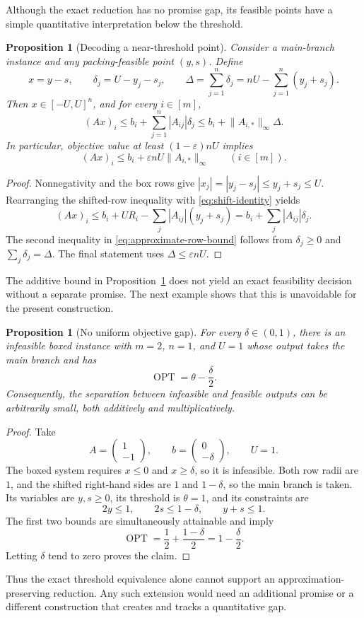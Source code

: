 \documentclass[11pt]{article}
\newtheorem{proposition}[theorem]{Proposition}
\theoremstyle{remark}
\newcommand{\OPT}{\operatorname{OPT}}
\begin{document}
Although the exact reduction has no promise gap, its feasible points
have a simple quantitative interpretation below the threshold.

\begin{proposition}[Decoding a near-threshold point]
\label{prop:approximate-decoding}
Consider a main-branch instance and any packing-feasible point
$(y,s)$.  Define
\[
  x=y-s,
  \qquad
  \delta_j=U-y_j-s_j,
  \qquad
  \Delta=\sum_{j=1}^n\delta_j
  =nU-\sum_{j=1}^n(y_j+s_j).
\]
Then $x\in[-U,U]^n$, and for every $i\in[m]$,
\begin{equation}
  \label{eq:approximate-row-bound}
  (Ax)_i
  \leq b_i+\sum_{j=1}^n|A_{ij}|\delta_j
  \leq b_i+\lVert A_{i,*}\rVert_\infty\Delta.
\end{equation}
In particular, objective value at least $(1-\varepsilon)nU$ implies
\[
  (Ax)_i\leq b_i+
  \varepsilon nU\lVert A_{i,*}\rVert_\infty
  \qquad(i\in[m]).
\]
\end{proposition}

\begin{proof}
Nonnegativity and the box rows give
$|x_j|=|y_j-s_j|\leq y_j+s_j\leq U$.  Rearranging the shifted-row
inequality with \eqref{eq:shift-identity} yields
\[
  (Ax)_i
  \leq b_i+UR_i-\sum_j|A_{ij}|(y_j+s_j)
  =b_i+\sum_j|A_{ij}|\delta_j.
\]
The second inequality in \eqref{eq:approximate-row-bound} follows
from $\delta_j\geq0$ and $\sum_j\delta_j=\Delta$.  The final statement
uses $\Delta\leq\varepsilon nU$.
\end{proof}

The additive bound in Proposition~\ref{prop:approximate-decoding} does not yield
an exact feasibility decision without a separate promise.  The next
example shows that this is unavoidable for the present construction.

\begin{proposition}[No uniform objective gap]
\label{prop:no-gap}
For every $\delta\in(0,1)$, there is an infeasible boxed instance with
$m=2$, $n=1$, and $U=1$ whose output takes the main branch and has
\[
  \OPT=\theta-\frac{\delta}{2}.
\]
Consequently, the separation between infeasible and feasible outputs
can be arbitrarily small, both additively and multiplicatively.
\end{proposition}

\begin{proof}
Take
\[
  A=\begin{pmatrix}1\\-1\end{pmatrix},
  \qquad
  b=\begin{pmatrix}0\\-\delta\end{pmatrix},
  \qquad U=1.
\]
The boxed system requires $x\leq0$ and $x\geq\delta$, so it is
infeasible.  Both row radii are $1$, and the shifted right-hand sides
are $1$ and $1-\delta$, so the main branch is taken.  Its variables
are $y,s\geq0$, its threshold is $\theta=1$, and its constraints are
\[
  2y\leq1,
  \qquad
  2s\leq1-\delta,
  \qquad
  y+s\leq1.
\]
The first two bounds are simultaneously attainable and imply
\[
  \OPT=\frac12+\frac{1-\delta}{2}
  =1-\frac{\delta}{2}.
\]
Letting $\delta$ tend to zero proves the claim.
\end{proof}

Thus the exact threshold equivalence alone cannot support an
approximation-preserving reduction.  Any such extension would need an
additional promise or a different construction that creates and tracks
a quantitative gap.



\end{document}

